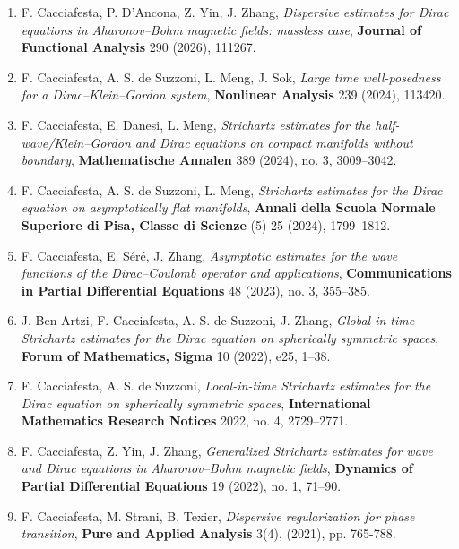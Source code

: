 \documentclass[10pt,a4paper]{article}
\newcommand{\venue}[1]{\textbf{#1}}
\newcommand{\FC}{{F. Cacciafesta}}
\begin{document}
\begin{enumerate}[label=\arabic*.,wide=0pt]
\small
\item \FC, P. D'Ancona, Z. Yin, J. Zhang, \emph{Dispersive estimates for Dirac equations in Aharonov--Bohm magnetic fields: massless case}, \venue{Journal of Functional Analysis} 290 (2026), 111267.

\item \FC, A. S. de Suzzoni, L. Meng, J. Sok, \emph{Large time well-posedness for a Dirac--Klein--Gordon system}, \venue{Nonlinear Analysis} 239 (2024), 113420.

\item \FC, E. Danesi, L. Meng, \emph{Strichartz estimates for the half-wave/Klein--Gordon and Dirac equations on compact manifolds without boundary}, \venue{Mathematische Annalen} 389 (2024), no. 3, 3009--3042.

\item \FC, A. S. de Suzzoni, L. Meng, \emph{Strichartz estimates for the Dirac equation on asymptotically flat manifolds}, \venue{Annali della Scuola Normale Superiore di Pisa, Classe di Scienze} (5) 25 (2024), 1799--1812.

\item \FC, E. S\'er\'e, J. Zhang, \emph{Asymptotic estimates for the wave functions of the Dirac--Coulomb operator and applications}, \venue{Communications in Partial Differential Equations} 48 (2023), no. 3, 355--385.

\item J. Ben-Artzi, \FC, A. S. de Suzzoni, J. Zhang, \emph{Global-in-time Strichartz estimates for the Dirac equation on spherically symmetric spaces}, \venue{Forum of Mathematics, Sigma} 10 (2022), e25, 1--38.

\item \FC, A. S. de Suzzoni, \emph{Local-in-time Strichartz estimates for the Dirac equation on spherically symmetric spaces}, \venue{International Mathematics Research Notices} 2022, no. 4, 2729--2771.

\item \FC, Z. Yin, J. Zhang, \emph{Generalized Strichartz estimates for wave and Dirac equations in Aharonov--Bohm magnetic fields}, \venue{Dynamics of Partial Differential Equations} 19 (2022), no. 1, 71--90.

\item \FC, M. Strani, B. Texier, \emph{Dispersive regularization for phase transition}, \venue{Pure and Applied Analysis}   3(4), (2021), pp. 765-788.


\end{enumerate}
\end{document}
